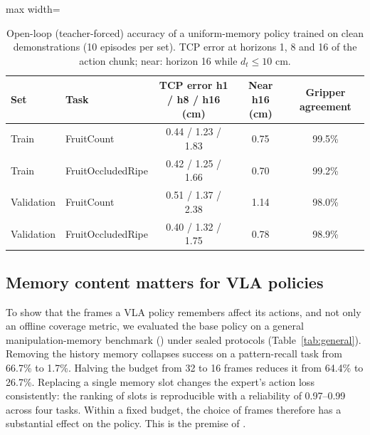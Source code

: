 \begin{table}[t]
\centering
\caption{Open-loop (teacher-forced) accuracy of a uniform-memory policy trained on clean demonstrations (10 episodes per set). TCP error at horizons 1, 8 and 16 of the action chunk; near: horizon 16 while $d_t \le 10$ cm.}
\label{tab:openloop}
\small
\begin{adjustbox}{max width=\textwidth}\begin{tabular}{llccc}
\toprule
Set & Task & TCP error h1 / h8 / h16 (cm) & Near h16 (cm) & Gripper agreement\\
\midrule
Train & FruitCount & 0.44 / 1.23 / 1.83 & 0.75 & 99.5\%\\
Train & FruitOccludedRipe & 0.42 / 1.25 / 1.66 & 0.70 & 99.2\%\\
Validation & FruitCount & 0.51 / 1.37 / 2.38 & 1.14 & 98.0\%\\
Validation & FruitOccludedRipe & 0.40 / 1.32 / 1.75 & 0.78 & 98.9\%\\
\bottomrule
\end{tabular}\end{adjustbox}
\end{table}

\subsection{Memory content matters for VLA policies}
\label{sec:res_general}
To show that the frames a VLA policy remembers affect its actions, and not only an offline coverage metric, we evaluated the base policy on a general manipulation-memory benchmark () under sealed protocols (Table~\ref{tab:general}). Removing the history memory collapses success on a pattern-recall task from 66.7\% to 1.7\%. Halving the budget from 32 to 16 frames reduces it from 64.4\% to 26.7\%. Replacing a single memory slot changes the expert's action loss consistently: the ranking of slots is reproducible with a reliability of 0.97--0.99 across four tasks. Within a fixed budget, the choice of frames therefore has a substantial effect on the policy. This is the premise of \pekm.

